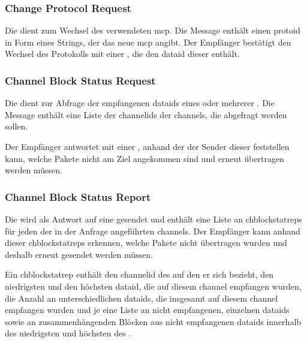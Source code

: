 \bmcpackbytefield


\subsubsection*{Change Protocol Request}
\label{dcl-bmcp-chprotoreq}
Die \msg{\bmcpchprotoreq} dient zum Wechsel des verwendeten \gls{mcp}.
Die Message enthält einen \gls{protoid} in Form eines Strings, der das neue
\gls{mcp} angibt.
Der Empfänger bestätigt den Wechsel des Protokolls mit einer \msg{\bmcpack},
die den \gls{dataid} dieser \msg{\bmcpchprotoreq} enthält.

\bmcpchprotoreqbytefield


\subsubsection*{Channel Block Status Request}
\label{dcl-bmcp-chblockstatreq}
Die \msg{\bmcpchblockstatreq} dient zur Abfrage der empfangenen \glspl{dataid}
eines oder mehrerer .
Die Message enthält eine Liste der \glspl{channelid} der \glspl{channel}, die
abgefragt werden sollen.

Der Empfänger antwortet mit einer \msg{\bmcpchblockstatrep}, anhand der der
Sender dieser \msg{\bmcpchblockstatreq} feststellen kann, welche Pakete nicht
am Ziel angekommen sind und erneut übertragen werden müssen.

\bmcpchblockstatreqbytefield


\subsubsection*{Channel Block Status Report}
\label{dcl-bmcp-chblockstatrep}
Die \msg{\bmcpchblockstatrep} wird als Antwort auf eine
\msg{\bmcpchblockstatreq} gesendet und enthält eine Liste an
\glspl{chblockstatrep} für jeden der in der Anfrage angeführten \glspl{channel}.
Der Empfänger kann anhand dieser \glspl{chblockstatrep} erkennen, welche Pakete
nicht übertragen wurden und deshalb erneut gesendet werden müssen.

Ein \gls{chblockstatrep} enthält den \gls{channelid} des
 auf den er sich bezieht,
den niedrigsten und den höchsten \gls{dataid}, die auf diesem \gls{channel}
empfangen wurden, %
die Anzahl an unterschiedlichen \glspl{dataid}, die insgesamt auf diesem
\gls{channel} empfangen wurden
und je eine Liste an nicht empfangenen, einzelnen \glspl{dataid} sowie an
zusammenhängenden Blöcken aus nicht empfangenen \glspl{dataid} innerhalb des
niedrigsten und höchsten  des
.

